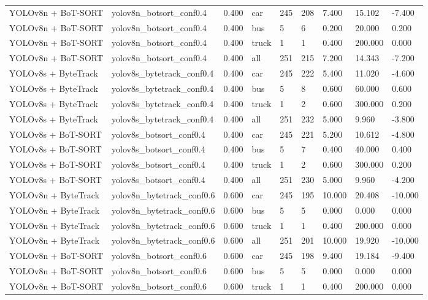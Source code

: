 \begin{tabular}{lllllllll}
YOLOv8n + BoT-SORT & yolov8n\_botsort\_conf0.4 & 0.400 & car & 245 & 208 & 7.400 & 15.102 & -7.400 \\
YOLOv8n + BoT-SORT & yolov8n\_botsort\_conf0.4 & 0.400 & bus & 5 & 6 & 0.200 & 20.000 & 0.200 \\
YOLOv8n + BoT-SORT & yolov8n\_botsort\_conf0.4 & 0.400 & truck & 1 & 1 & 0.400 & 200.000 & 0.000 \\
YOLOv8n + BoT-SORT & yolov8n\_botsort\_conf0.4 & 0.400 & all & 251 & 215 & 7.200 & 14.343 & -7.200 \\
YOLOv8s + ByteTrack & yolov8s\_bytetrack\_conf0.4 & 0.400 & car & 245 & 222 & 5.400 & 11.020 & -4.600 \\
YOLOv8s + ByteTrack & yolov8s\_bytetrack\_conf0.4 & 0.400 & bus & 5 & 8 & 0.600 & 60.000 & 0.600 \\
YOLOv8s + ByteTrack & yolov8s\_bytetrack\_conf0.4 & 0.400 & truck & 1 & 2 & 0.600 & 300.000 & 0.200 \\
YOLOv8s + ByteTrack & yolov8s\_bytetrack\_conf0.4 & 0.400 & all & 251 & 232 & 5.000 & 9.960 & -3.800 \\
YOLOv8s + BoT-SORT & yolov8s\_botsort\_conf0.4 & 0.400 & car & 245 & 221 & 5.200 & 10.612 & -4.800 \\
YOLOv8s + BoT-SORT & yolov8s\_botsort\_conf0.4 & 0.400 & bus & 5 & 7 & 0.400 & 40.000 & 0.400 \\
YOLOv8s + BoT-SORT & yolov8s\_botsort\_conf0.4 & 0.400 & truck & 1 & 2 & 0.600 & 300.000 & 0.200 \\
YOLOv8s + BoT-SORT & yolov8s\_botsort\_conf0.4 & 0.400 & all & 251 & 230 & 5.000 & 9.960 & -4.200 \\
YOLOv8n + ByteTrack & yolov8n\_bytetrack\_conf0.6 & 0.600 & car & 245 & 195 & 10.000 & 20.408 & -10.000 \\
YOLOv8n + ByteTrack & yolov8n\_bytetrack\_conf0.6 & 0.600 & bus & 5 & 5 & 0.000 & 0.000 & 0.000 \\
YOLOv8n + ByteTrack & yolov8n\_bytetrack\_conf0.6 & 0.600 & truck & 1 & 1 & 0.400 & 200.000 & 0.000 \\
YOLOv8n + ByteTrack & yolov8n\_bytetrack\_conf0.6 & 0.600 & all & 251 & 201 & 10.000 & 19.920 & -10.000 \\
YOLOv8n + BoT-SORT & yolov8n\_botsort\_conf0.6 & 0.600 & car & 245 & 198 & 9.400 & 19.184 & -9.400 \\
YOLOv8n + BoT-SORT & yolov8n\_botsort\_conf0.6 & 0.600 & bus & 5 & 5 & 0.000 & 0.000 & 0.000 \\
YOLOv8n + BoT-SORT & yolov8n\_botsort\_conf0.6 & 0.600 & truck & 1 & 1 & 0.400 & 200.000 & 0.000 \\

\end{tabular}
